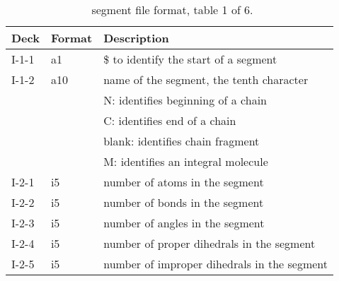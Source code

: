 \begin{table}[htbp]
\begin{center}
\begin{tabular*}{150mm}{p{12mm}p{12mm}l}
\hline\hline
Deck  & Format & Description \\ \hline
I-1-1 & a1     & \$ to identify the start of a segment \\ %
I-1-2 & a10    & name of the segment, the tenth character\\
      &        & N: identifies beginning of a chain\\
      &        & C: identifies end of a chain\\
      &        & blank: identifies chain fragment\\
      &        & M: identifies an integral molecule\\
I-2-1 & i5     & number of atoms in the segment\\
I-2-2 & i5     & number of bonds in the segment\\
I-2-3 & i5     & number of angles in the segment\\
I-2-4 & i5     & number of proper dihedrals in the segment\\
I-2-5 & i5     & number of improper dihedrals in the segment\\
\hline
\end{tabular*}
\caption{\nwargos\ segment file format, table 1 of 6.\label{tbl:nwaseg1}}
\end{center}
\end{table}

